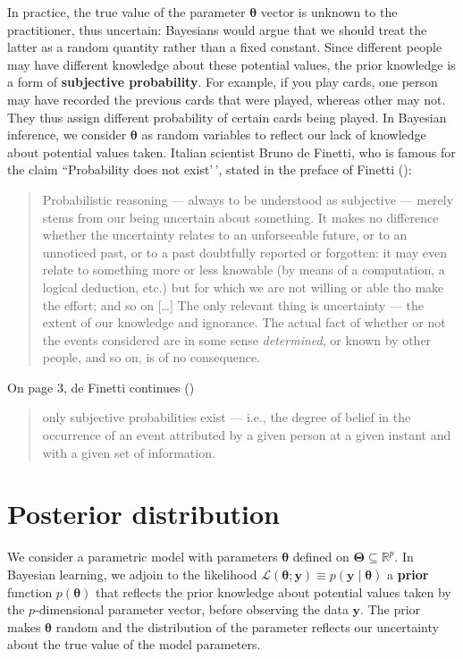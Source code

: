 \documentclass[
  11pt,
  letterpaper,
]{scrbook}
\theoremstyle{definition}
\theoremstyle{plain}
\theoremstyle{plain}
\theoremstyle{plain}
\theoremstyle{definition}
\theoremstyle{definition}
\theoremstyle{plain}
\theoremstyle{plain}
\theoremstyle{remark}
\begin{document}
In practice, the true value of the parameter \(\boldsymbol{\theta}\)
vector is unknown to the practitioner, thus uncertain: Bayesians would
argue that we should treat the latter as a random quantity rather than a
fixed constant. Since different people may have different knowledge
about these potential values, the prior knowledge is a form of
\textbf{subjective probability}. For example, if you play cards, one
person may have recorded the previous cards that were played, whereas
other may not. They thus assign different probability of certain cards
being played. In Bayesian inference, we consider \(\boldsymbol{\theta}\)
as random variables to reflect our lack of knowledge about potential
values taken. Italian scientist Bruno de Finetti, who is famous for the
claim ``Probability does not exist'\,', stated in the preface of Finetti
():

\begin{quote}
Probabilistic reasoning --- always to be understood as subjective ---
merely stems from our being uncertain about something. It makes no
difference whether the uncertainty relates to an unforseeable future, or
to an unnoticed past, or to a past doubtfully reported or forgotten: it
may even relate to something more or less knowable (by means of a
computation, a logical deduction, etc.) but for which we are not willing
or able tho make the effort; and so on {[}\ldots{]} The only relevant
thing is uncertainty --- the extent of our knowledge and ignorance. The
actual fact of whether or not the events considered are in some sense
\emph{determined}, or known by other people, and so on, is of no
consequence.
\end{quote}

On page 3, de Finetti continues ()

\begin{quote}
only subjective probabilities exist --- i.e., the degree of belief in
the occurrence of an event attributed by a given person at a given
instant and with a given set of information.
\end{quote}

\section{Posterior distribution}\label{posterior-distribution}

We consider a parametric model with parameters \(\boldsymbol{\theta}\)
defined on \(\boldsymbol{\Theta} \subseteq \mathbb{R}^p.\) In Bayesian
learning, we adjoin to the likelihood
\(\mathcal{L}(\boldsymbol{\theta}; \boldsymbol{y}) \equiv p(\boldsymbol{y} \mid \boldsymbol{\theta})\)
a \textbf{prior} function \(p(\boldsymbol{\theta})\) that reflects the
prior knowledge about potential values taken by the \(p\)-dimensional
parameter vector, before observing the data \(\boldsymbol{y}.\) The
prior makes \(\boldsymbol{\theta}\) random and the distribution of the
parameter reflects our uncertainty about the true value of the model
parameters.
\end{document}

